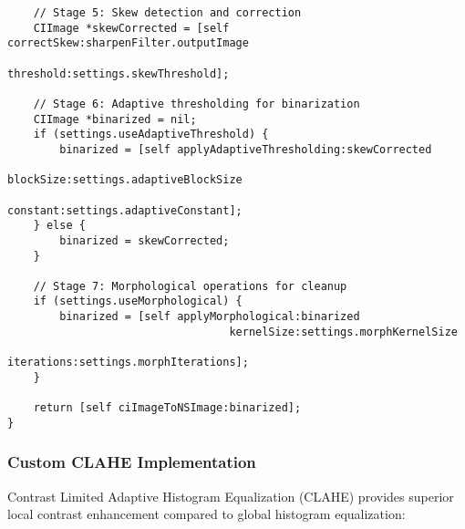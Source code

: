 \begin{verbatim}
    // Stage 5: Skew detection and correction
    CIImage *skewCorrected = [self correctSkew:sharpenFilter.outputImage 
                                     threshold:settings.skewThreshold];
    
    // Stage 6: Adaptive thresholding for binarization
    CIImage *binarized = nil;
    if (settings.useAdaptiveThreshold) {
        binarized = [self applyAdaptiveThresholding:skewCorrected
                                         blockSize:settings.adaptiveBlockSize
                                         constant:settings.adaptiveConstant];
    } else {
        binarized = skewCorrected;
    }
    
    // Stage 7: Morphological operations for cleanup
    if (settings.useMorphological) {
        binarized = [self applyMorphological:binarized 
                                  kernelSize:settings.morphKernelSize
                                  iterations:settings.morphIterations];
    }
    
    return [self ciImageToNSImage:binarized];
}
\end{verbatim}

\subsubsection{Custom CLAHE Implementation}

Contrast Limited Adaptive Histogram Equalization (CLAHE) provides superior local contrast enhancement compared to global histogram equalization:

